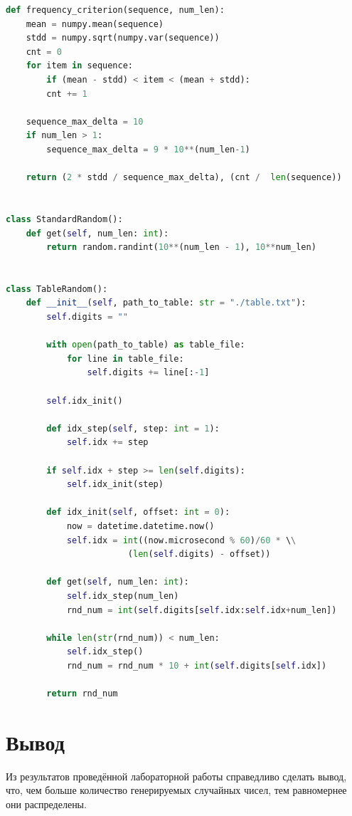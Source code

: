 \documentclass[a4paper, 12pt]{article}
\begin{document}

\lstset{style=mystyle}

\begin{lstlisting}[language=Python, caption = Программная реализация генерации псевдослучайных чисел программным и табличным методом]
def frequency_criterion(sequence, num_len):
	mean = numpy.mean(sequence)
	stdd = numpy.sqrt(numpy.var(sequence))
	cnt = 0
	for item in sequence:
		if (mean - stdd) < item < (mean + stdd):
		cnt += 1
	
	sequence_max_delta = 10
	if num_len > 1:
		sequence_max_delta = 9 * 10**(num_len-1)
	
	return (2 * stdd / sequence_max_delta), (cnt /  len(sequence))


class StandardRandom():
	def get(self, num_len: int):
		return random.randint(10**(num_len - 1), 10**num_len)


class TableRandom():
	def __init__(self, path_to_table: str = "./table.txt"):
		self.digits = ""
		
		with open(path_to_table) as table_file:
			for line in table_file:
				self.digits += line[:-1]
		
		self.idx_init()
		
		def idx_step(self, step: int = 1):
			self.idx += step
		
		if self.idx + step >= len(self.digits):
			self.idx_init(step)
		
		def idx_init(self, offset: int = 0):
			now = datetime.datetime.now()
			self.idx = int((now.microsecond % 60)/60 * \\
						(len(self.digits) - offset))
		
		def get(self, num_len: int):
			self.idx_step(num_len)
			rnd_num = int(self.digits[self.idx:self.idx+num_len])
		
		while len(str(rnd_num)) < num_len:
			self.idx_step()
			rnd_num = rnd_num * 10 + int(self.digits[self.idx])

		return rnd_num
\end{lstlisting}
\section{Вывод}
\hspace*{5mm} Из результатов проведённой лабораторной работы справедливо сделать вывод, что, чем больше количество генерируемых случайных чисел, тем равномернее они распределены.
\end{document}
